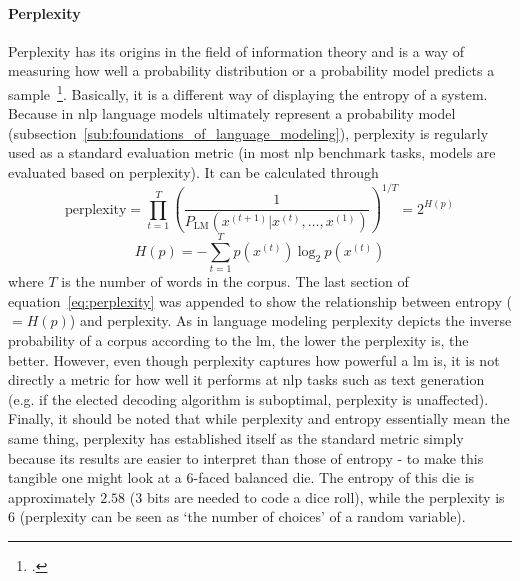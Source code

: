 \paragraph{Perplexity}
Perplexity has its origins in the field of information theory and is a way of measuring how well a probability distribution or a probability model predicts a sample~\footcite{10.2307/24980838}. Basically, it is a different way of displaying the entropy of a system. Because in \gls{nlp} language models ultimately represent a probability model (subsection~\ref{sub:foundations_of_language_modeling}), perplexity is regularly used as a standard evaluation metric (in most \gls{nlp} benchmark tasks, models are evaluated based on perplexity). It can be calculated through
\begin{equation}
	\label{eq:perplexity}
	\text{perplexity} = \prod_{t=1}^{T} \left( \frac{1}{P_{\text{LM}}(x^{(t+1)} | x^{(t)}, \dots, x^{(1)})} \right)^{1/T} = 2^{H(p)}
\end{equation}
\begin{equation}
	H(p) = - \sum_{t=1}^{T} p(x^{(t)}) \ \text{log}_2 \ p(x^{(t)})
\end{equation}
where $ T $ is the number of words in the corpus. The last section of equation~\ref{eq:perplexity} was appended to show the relationship between entropy ($ = H(p) $) and perplexity. As in language modeling perplexity depicts the inverse probability of a corpus according to the \gls{lm}, the lower the perplexity is, the better. However, even though perplexity captures how powerful a \gls{lm} is, it is not directly a metric for how well it performs at \gls{nlp} tasks such as text generation (e.g. if the elected decoding algorithm is suboptimal, perplexity is unaffected). Finally, it should be noted that while perplexity and entropy essentially mean the same thing, perplexity has established itself as the standard metric simply because its results are easier to interpret than those of entropy - to make this tangible one might look at a 6-faced balanced die. The entropy of this die is approximately $ 2.58 $ (3 bits are needed to code a dice roll), while the perplexity is $ 6 $ (perplexity can be seen as `the number of choices' of a random variable).

